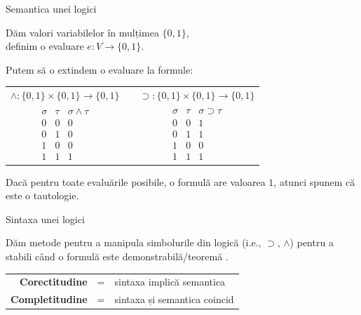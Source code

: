 \documentclass[xcolor=pdftex,romanian,colorlinks]{beamer}
\begin{document}
\begin{frame}{Semantica unei logici}

Dăm valori variabilelor în mulțimea $\{0,1\}$,\\  \alert{definim o evaluare $e : V \to \{0,1\}$}.

\medskip
Putem să o extindem o evaluare la formule:
\begin{center}
\begin{tabular}{ccc}
$\wedge:\{0,1\}\times \{0,1\}\to\{0,1\}$  & & $\supset:\{0,1\}\times \{0,1\}\to\{0,1\}$\\[.4em]
$
\begin{array}{c|c|c}
\sigma&\tau&  \sigma \wedge \tau  \\ \hline
0 & 0 & 0 \\
0& 1& 0\\
1&0& 0\\
1&1& 1
\end{array} 
$
& &
$
\begin{array}{c|c|c}
\sigma&\tau&  \sigma \supset \tau  \\ \hline
0 & 0 & 1 \\
0& 1& 1\\
1&0& 0\\
1&1& 1
\end{array}
$
\end{tabular}
\end{center}

\medskip 
Dacă pentru toate evaluările posibile, o formulă are valoarea  $1$, atunci spunem că este o \alert{tautologie}.
\end{frame}

\begin{frame}{Sintaxa unei logici}

Dăm metode pentru a manipula simbolurile din logică (i.e., $\supset$, $\wedge$) pentru a stabili când o formulă este \alert{demonstrabilă/teoremă} .

\begin{center}
\begin{tabular}{rcl}
\textbf{\alert{Corectitudine}} & = & sintaxa implică semantica \\
\textbf{\alert{Completitudine}} & = & sintaxa și semantica coincid 
\end{tabular}
\end{center}
\end{frame}
\end{document}
